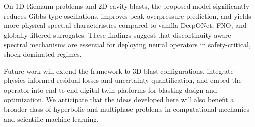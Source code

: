 \documentclass[a4paper,fleqn]{cas-dc}
\begin{document}
On 1D Riemann problems and 2D cavity blasts, the proposed model significantly reduces Gibbs-type oscillations, improves peak overpressure prediction, and yields more physical spectral characteristics compared to vanilla DeepONet, FNO, and globally filtered surrogates.
These findings suggest that discontinuity-aware spectral mechanisms are essential for deploying neural operators in safety-critical, shock-dominated regimes.

Future work will extend the framework to 3D blast configurations, integrate physics-informed residual losses and uncertainty quantification, and embed the operator into end-to-end digital twin platforms for blasting design and optimization.
We anticipate that the ideas developed here will also benefit a broader class of hyperbolic and multiphase problems in computational mechanics and scientific machine learning.



\printcredits



\end{document}
